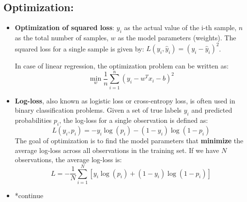 \documentclass[16pt]{article}
\begin{document}
	\subsection{Optimization:}
	\begin{itemize}
		\item \textbf{Optimization of squared loss}: \(y_i\) as the actual value of the i-th sample,  \(n\) as the total number of samples, \(w\) as the model parameters (weights). The squared loss for a single sample is given by: $ L(y_i, \hat{y}_i) = (y_i - \hat{y}_i)^2 $.
		
		In case of linear regression, the optimization problem can be written as:
		$$\min_{w} \frac{1}{n} \sum_{i=1}^{n} (y_i - w^T x_i - b)^2$$
		\item \textbf{Log-loss}, also known as logistic loss or cross-entropy loss, is often used in binary classification problems. Given a set of true labels \(y_i\) and predicted probabilities \(p_i\), the log-loss for a single observation is defined as:
		\[
		L(y_i, p_i) = -y_i \log(p_i) - (1 - y_i) \log(1 - p_i)
		\]
		The goal of optimization is to find the model parameters that \textbf{minimize} the average log-loss across all observations in the training set. If we have \(N\) observations, the average log-loss is:
		\[
		L = -\frac{1}{N} \sum_{i=1}^{N} [y_i \log(p_i) + (1 - y_i) \log(1 - p_i)]
		\]
		\item *continue
	\end{itemize}
	
\end{document}
